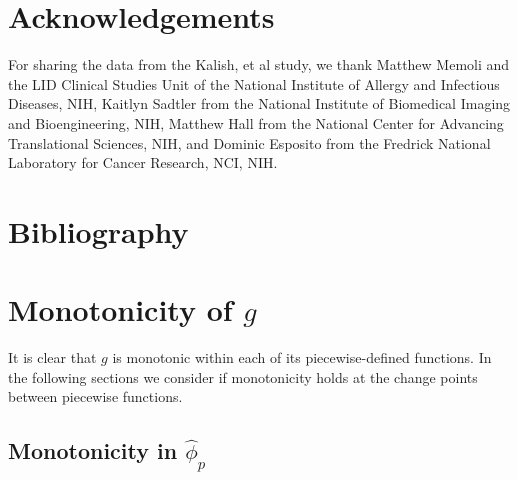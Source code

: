 \documentclass[AMA,STIX1COL]{WileyNJD-v2}
\begin{document}
\section{Acknowledgements}
For sharing the data from the Kalish, et al study, we thank Matthew Memoli and the LID Clinical Studies Unit of the National Institute of Allergy and Infectious Diseases, NIH,  Kaitlyn Sadtler from the National Institute of Biomedical Imaging and Bioengineering, NIH,   Matthew Hall from the National Center for Advancing Translational Sciences, NIH, and Dominic Esposito from the Fredrick National Laboratory for Cancer Research, NCI, NIH.

\section{Bibliography}
\nocite{*}%
%

\appendix

\section{Monotonicity of \( g \)}
\label{monotonicity}
It is clear that \( g \) is monotonic within each of its piecewise-defined functions.
In the following sections we consider if monotonicity holds at the change points between piecewise functions.

\subsection{Monotonicity in \( \hat{\phi}_p \)}
\end{document}
